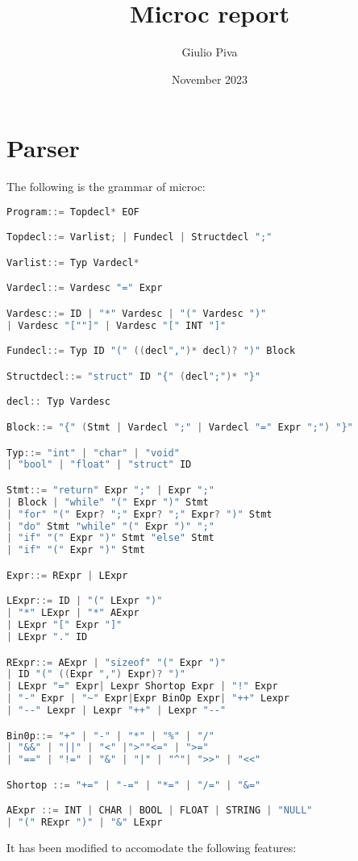 \documentclass{article}
\title{Microc report}
\author{Giulio Piva}
\date{November 2023}
\begin{document}
\maketitle


\section{Parser}
The following is the grammar of microc:
\begin{lstlisting}[language=C, basicstyle=\ttfamily\fontsize{8pt}{14pt}, keywordstyle=\color{blue}, commentstyle=\color{green}]
Program::= Topdecl* EOF

Topdecl::= Varlist; | Fundecl | Structdecl ";"

Varlist::= Typ Vardecl*

Vardecl::= Vardesc "=" Expr

Vardesc::= ID | "*" Vardesc | "(" Vardesc ")"
| Vardesc "[""]" | Vardesc "[" INT "]"

Fundecl::= Typ ID "(" ((decl",")* decl)? ")" Block

Structdecl::= "struct" ID "{" (decl";")* "}"

decl:: Typ Vardesc

Block::= "{" (Stmt | Vardecl ";" | Vardecl "=" Expr ";") "}"

Typ::= "int" | "char" | "void"
| "bool" | "float" | "struct" ID

Stmt::= "return" Expr ";" | Expr ";"
| Block | "while" "(" Expr ")" Stmt
| "for" "(" Expr? ";" Expr? ";" Expr? ")" Stmt
| "do" Stmt "while" "(" Expr ")" ";"
| "if" "(" Expr ")" Stmt "else" Stmt
| "if" "(" Expr ")" Stmt

Expr::= RExpr | LExpr

LExpr::= ID | "(" LExpr ")"
| "*" LExpr | "*" AExpr
| LExpr "[" Expr "]"
| LExpr "." ID

RExpr::= AExpr | "sizeof" "(" Expr ")"
| ID "(" ((Expr ",") Expr)? ")"
| LExpr "=" Expr| Lexpr Shortop Expr | "!" Expr
| "-" Expr | "~" Expr|Expr BinOp Expr| "++" Lexpr
| "--" Lexpr | Lexpr "++" | Lexpr "--"

Bin0p::= "+" | "-" | "*" | "%" | "/"
| "&&" | "||" | "<" |">""<=" | ">="
| "==" | "!=" | "&" | "|" | "^"| ">>" | "<<"

Shortop ::= "+=" | "-=" | "*=" | "/=" | "&="

AExpr ::= INT | CHAR | BOOL | FLOAT | STRING | "NULL"
| "(" RExpr ")" | "&" LExpr
\end{lstlisting}
It has been modified to accomodate the following features:
\end{document}
